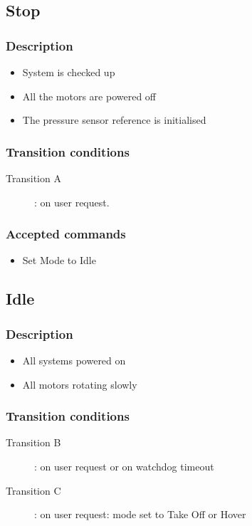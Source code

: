 \documentclass{article}
\begin{document}
\subsection{Stop}
\subsubsection{Description}
\begin{itemize}
\item System is checked up
\item All the motors are powered off
\item The pressure sensor reference is initialised
\end{itemize}
\subsubsection{Transition conditions}
\begin{description}
\item[Transition A]: on user request.
\end{description}
\subsubsection{Accepted commands}
\begin{itemize}
\item Set Mode to Idle
\end{itemize}

\subsection{Idle}
\subsubsection{Description}
\begin{itemize}
\item All systems powered on
\item All motors rotating slowly
\end{itemize}
\subsubsection{Transition conditions}
\begin{description}
\item[Transition B]: on user request or on watchdog timeout
\item[Transition C]: on user request: mode set to Take Off or Hover
\end{description}
\end{document}
